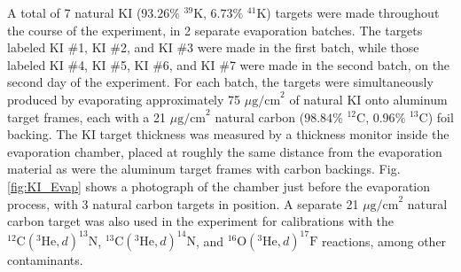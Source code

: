 A total of 7 natural KI ($93.26\%$ $^{39}$K, $6.73\%$ $^{41}$K) targets were made throughout the course of the experiment, in 2 separate evaporation batches. The targets labeled KI $\#$1, KI $\#$2, and KI $\#$3 were made in the first batch, while those labeled KI $\#$4, KI $\#$5, KI $\#$6, and KI $\#$7 were made in the second batch, on the second day of the experiment. For each batch, the targets were simultaneously produced by evaporating approximately 75 $\mu\mathrm{g/cm}^{2}$ of natural KI onto aluminum target frames, each with a 21 $\mu\mathrm{g/cm}^{2}$ natural carbon ($98.84\%$ $^{12}$C, $0.96\%$ $^{13}$C) foil backing. The KI target thickness was measured by a thickness monitor inside the evaporation chamber, placed at roughly the same distance from the evaporation material as were the aluminum target frames with carbon backings. Fig. \ref{fig:KI_Evap} shows a photograph of the chamber just before the evaporation process, with 3 natural carbon targets in position. A separate 21 $\mu\mathrm{g/cm}^{2}$ natural carbon target was also used in the experiment for calibrations with the $^{12}\mathrm{C}(^{3}\mathrm{He},d)^{13}\mathrm{N}$, $^{13}\mathrm{C}(^{3}\mathrm{He},d)^{14}\mathrm{N}$, and $^{16}\mathrm{O}(^{3}\mathrm{He},d)^{17}\mathrm{F}$ reactions, among other contaminants.

